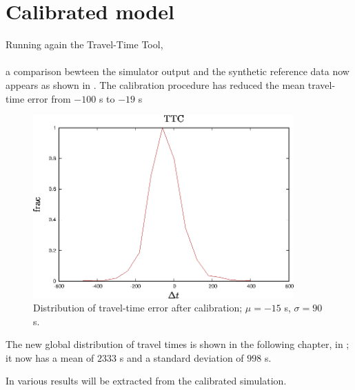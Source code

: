 \section{Calibrated model}

Running again the Travel-Time Tool, \\
 \\
a comparison bewteen the simulator output and the synthetic
reference data now appears as shown in .
The calibration procedure has reduced the mean travel-time error from $-100$ s to $-19$ s 

\begin{figure}[ht]
  \centering
  \includegraphics[angle=0,width=10cm]{80_figs/_PostCalib_TTC_0500-0900.eps}
  \caption{Distribution of travel-time error after calibration; $\mu=-15$ s, $\sigma=90$ s.}
  \label{TTdiff2}
\end{figure}

The new global distribution of travel times is shown in the following
chapter, in ; it now has a mean of $2333$ s and a
standard deviation of $998$ s.

In  various results will be extracted from the
calibrated simulation.
